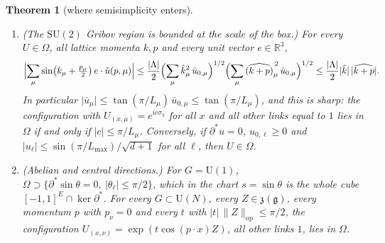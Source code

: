 \documentclass[11pt,a4paper]{amsart}
\newtheorem{theorem}{Theorem}[section]
\theoremstyle{definition}
\theoremstyle{remark}
\numberwithin{equation}{section}
\newcommand{\R}{\mathbb{R}}          %
\newcommand{\norm}[1]{\lVert #1\rVert}     %
\newcommand{\abs}[1]{\lvert #1\rvert}      %
\newcommand{\SU}{\mathrm{SU}}              %
\newcommand{\U}{\mathrm{U}}                %
\begin{document}
\begin{theorem}[where semisimplicity enters]
\begin{enumerate}[label=\textup{(\alph*)},leftmargin=*]
\item \textup{(The $\SU(2)$ Gribov region is bounded at the scale of the box.)} For every $U\in\Omega$, all lattice momenta $k,p$ and every unit vector $e\in\R^3$,
\[
\Bigl|\sum_\mu\sin\bigl(k_\mu+\tfrac{p_\mu}2\bigr)\,e\cdot\tilde u(p,\mu)\Bigr|\le\frac{\abs\Lambda}2\Bigl(\sum_\mu\hat k_\mu^2\,\bar u_{0,\mu}\Bigr)^{1/2}\Bigl(\sum_\mu\widehat{(k+p)}_\mu^{\,2}\,\bar u_{0,\mu}\Bigr)^{1/2}\le\frac{\abs\Lambda}2\abs{\hat k}\,\abs{\widehat{k+p}}.
\]
In particular $\abs{\bar u_\mu}\le\tan(\pi/L_\mu)\,\bar u_{0,\mu}\le\tan(\pi/L_\mu)$, and this is sharp: the configuration with $U_{(x,\mu)}=e^{ic\sigma_3}$ for all $x$ and all other links equal to $1$ lies in $\Omega$ if and only if $\abs c\le\pi/L_\mu$. Conversely, if $\partial^*u=0$, $u_{0,\ell}\ge0$ and $\abs{u_\ell}\le\sin(\pi/L_{\max})/\sqrt{d+1}$ for all $\ell$, then $U\in\Omega$.
\item \textup{(Abelian and central directions.)} For $G=\U(1)$, $\Omega\supset\{\partial^*\sin\theta=0,\ \abs{\theta_\ell}\le\pi/2\}$, which in the chart $s=\sin\theta$ is the whole cube $[-1,1]^E\cap\ker\partial^*$. For every $G\subset\U(N)$, every $Z\in\mathfrak z(\mathfrak g)$, every momentum $p$ with $p_\nu=0$ and every $t$ with $\abs t\,\norm Z_{\mathrm{op}}\le\pi/2$, the configuration $U_{(x,\nu)}=\exp(t\cos(p\cdot x)Z)$, all other links $1$, lies in $\Omega$.
\end{enumerate}
\end{theorem}
\end{document}
